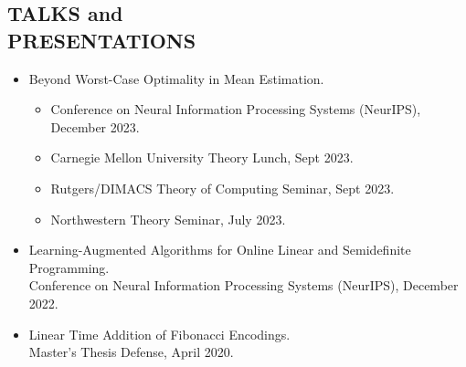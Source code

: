 \documentclass[margin, 10pt]{res} %
\begin{document}
\begin{resume}
\section{TALKS and \\ PRESENTATIONS}
\begin{itemize}
\item Beyond Worst-Case Optimality in Mean Estimation.
\begin{itemize}
    \item Conference on Neural Information Processing Systems (NeurIPS), December 2023.
    \item Carnegie Mellon University Theory Lunch, Sept 2023.
    \item Rutgers/DIMACS Theory of Computing Seminar, Sept 2023.
    \item Northwestern Theory Seminar, July 2023.
\end{itemize}

\item Learning-Augmented Algorithms for Online Linear and Semidefinite Programming.\\
Conference on Neural Information Processing Systems (NeurIPS), December 2022.

\item Linear Time Addition of Fibonacci Encodings.\\
Master's Thesis Defense, April 2020.
\end{itemize}



\end{resume}
\end{document}
